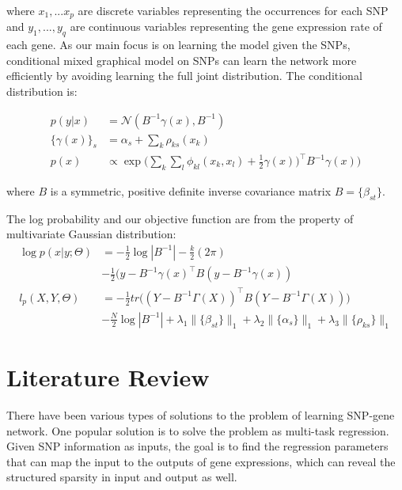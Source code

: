 \documentclass{article}
\begin{document}
where $x_1, ... x_p$ are discrete variables representing the occurrences for each SNP and $y_1, ..., y_q$ are continuous variables representing the gene expression rate of each gene. As our main focus is on learning the model given the SNPs, conditional mixed graphical model on SNPs can learn the network more efficiently by avoiding learning the full joint distribution. The conditional distribution is:

\begin{align}
p(y|x) &= \mathcal{N}(B^{-1}\gamma(x), B^{-1}) \label{eq:cond_prob}\\
\{\gamma(x)\}_s &= \alpha_s + \sum_{k} \rho_{ks}(x_k) \\
p(x) &\propto \exp \Big( \sum_{k} \sum_{l} \phi_{kl}(x_k, x_l) + \frac{1}{2} \gamma(x))^\intercal B^{-1} \gamma(x) \Big)
\end{align}

where $B$ is a symmetric, positive definite inverse covariance matrix $B = \{ \beta_{st}\}$.

The log probability and our objective function are from the property of multivariate Gaussian distribution:
\begin{align}
\log p(x| y; \Theta) &= -\frac{1}{2}\log |B^{-1}| -\frac{k}{2} (2 \pi) \nonumber \\
& -\frac{1}{2} (y - B^{-1} \gamma(x)^\intercal B (y - B^{-1} \gamma(x)) \\
l_p(X, Y, \Theta) &= -\frac{1}{2} tr\Big((Y - B^{-1} \Gamma(X))^\intercal B (Y - B^{-1} \Gamma(X)) \Big) \nonumber \\
& -\frac{N}{2} \log|B^{-1}| + \lambda_1 \|\{\beta_{st}\}\|_1 + \lambda_2 \|\{\alpha_s\}\|_1 + \lambda_3 \|\{\rho_{ks}\}\|_1 \label{eq:obj}
\end{align}

\section{Literature Review}
\label{LiteratureReview}

There have been various types of solutions to the problem of learning SNP-gene network. One popular solution is to solve the problem as multi-task regression.
Given SNP information as inputs, the goal is to find the regression parameters that can map the input to the outputs of gene expressions, which can reveal the structured sparsity in input and output as well.

\end{document}
